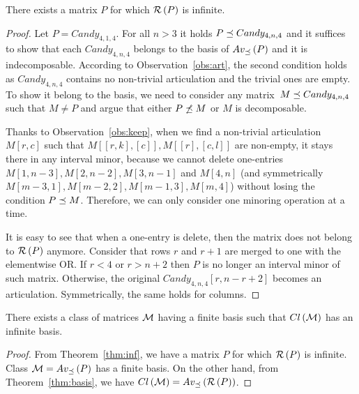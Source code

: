 \begin{thm}
\label{thm:inf}
There exists a matrix $P$ for which $\mathcal{R}\left(P\right)$ is infinite.
\end{thm}
\begin{proof}
Let $P=Candy_{4,1,4}$. For all $n>3$ it holds $P\preceq Candy_{4,n,4}$ and it suffices to show that each $Candy_{4,n,4}$ belongs to the basis of $Av_{\preceq}\left(P\right)$ and it is indecomposable. According to Observation~\ref{obs:art}, the second condition holds as $Candy_{4,n,4}$ contains no non-trivial articulation and the trivial ones are empty. To show it belong to the basis, we need to consider any matrix~$M\preceq Candy_{4,n,4}$ such that $M\neq P$ and argue that either $P\not\preceq M$ or $M$ is decomposable.

Thanks to Observation~\ref{obs:keep}, when we find a non-trivial articulation~$M[r,c]$ such that $M[[r,k],[c]],M[[r],[c,l]]$ are non-empty, it stays there in any interval minor, because we cannot delete one-entries $M[1,n-3],M[2,n-2],M[3,n-1]$ and $M[4,n]$ (and symmetrically $M[m-3,1],M[m-2,2],M[m-1,3],M[m,4]$) without losing the condition $P\preceq M$. Therefore, we can only consider one minoring operation at a time.

It is easy to see that when a one-entry is delete, then the matrix does not belong to $\mathcal{R}\left(P\right)$ anymore. Consider that rows $r$ and $r+1$ are merged to one with the elementwise OR. If $r<4$ or $r>n+2$ then $P$ is no longer an interval minor of such matrix. Otherwise, the original $Candy_{4,n,4}[r,n-r+2]$ becomes an articulation. Symmetrically, the same holds for columns.
\end{proof}

\begin{cor}
There exists a class of matrices $\mathcal{M}$ having a finite basis such that $Cl\left(\mathcal{M}\right)$ has an infinite basis.
\end{cor}
\begin{proof}
From Theorem~\ref{thm:inf}, we have a matrix $P$ for which $\mathcal{R}\left(P\right)$ is infinite. Class $\mathcal{M}=Av_{\preceq}\left(P\right)$ has a finite basis. On the other hand, from Theorem~\ref{thm:basis}, we have $Cl\left(\mathcal{M}\right)=Av_{\preceq}\left(\mathcal{R}\left(P\right)\right)$.
\end{proof}